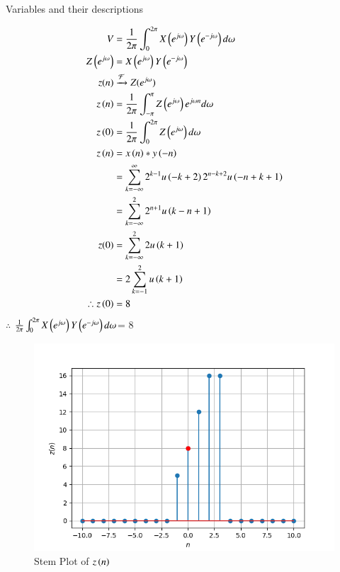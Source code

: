 \documentclass[journal,12pt,twocolumn]{IEEEtran}
\theoremstyle{remark}
\begin{document}
\begin{table}[h]
         
         \caption{Variables and their descriptions}
     \end{table}
\begin{align}
    V&=\frac{1}{2\pi}\int_{0}^{2\pi} X\left(e^{j\omega}\right) Y\left(e^{-j\omega}\right) d \omega\\
     Z\left(e^{j\omega}\right)&= X\left(e^{j\omega}\right) Y\left(e^{-j \omega}\right)\\
           z(n)&\xrightarrow{\mathcal{F}} Z(e^{j\omega})\\
           z\left(n\right)&=\frac{1}{2\pi}\int_{-\pi}^{\pi} Z\left(e^{j\omega}\right) e^{j\omega n} d\omega\\
      z\left(0\right)&=\frac{1}{2\pi}\int_{0}^{2\pi} Z\left(e^{j\omega}\right) d \omega\\
   z\left( n\right)&= x\left(n\right) * y\left(-n\right)\\
   &=\sum_{k=-\infty}^{\infty} 2^{k-1} u\left(-k+2\right) 2^{n-k+2} u\left(-n+k+1\right)\\
   &=\sum_{k=-\infty}^{2} 2^{n+1} u\left(k-n+1\right)\\
   z(0)&=\sum_{k=-\infty}^{2} 2 u\left(k+1\right)\\
   &=2\sum_{k=-1}^{2}u\left(k+1\right)\\
  \therefore z\left(0\right) &=8
\end{align}
$\therefore$ $\frac{1}{2\pi}\int_{0}^{2\pi} X\left(e^{j\omega}\right) Y\left(e^{-j\omega}\right) d \omega$= $8$
\renewcommand{\thefigure}{\theenumi}
 \renewcommand{\thetable}{\theenumi}
\begin{figure}[h]
  
  \includegraphics[width=\columnwidth]{figs/Figure_1.png}
  \caption{Stem Plot of $z\left(n\right)$}
\end{figure}
\end{document}
